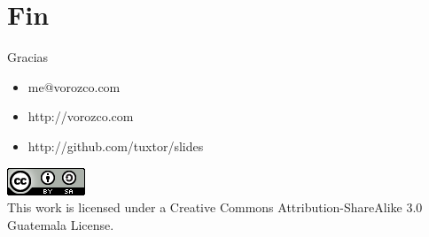 \documentclass{beamer}
\begin{document}
\section{Fin}
\begin{frame}{Gracias}
\begin{itemize}
\item me@vorozco.com
\item http://vorozco.com
\item http://github.com/tuxtor/slides
\end{itemize}
\begin{center}
\includegraphics[width=0.1\linewidth]{Images/cclogo}
\\
This work is licensed under a Creative Commons Attribution-ShareAlike 3.0 Guatemala License.
\end{center}
\end{frame}
\end{document}
